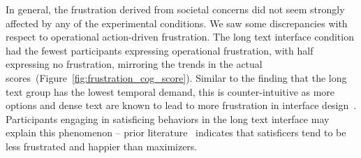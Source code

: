 In general, the frustration derived from societal concerns did not seem strongly affected by any of the experimental conditions. We saw some discrepancies with respect to operational action-driven frustration. The long text interface condition had the fewest participants expressing operational frustration, with half expressing no frustration, mirroring the trends in the actual scores~(Figure~\ref{fig:frustration_cog_score}). Similar to the finding that the long text group has the lowest temporal demand, this is counter-intuitive as more options and dense text are known to lead to more frustration in interface design~\cite{nielsen1997users}. Participants engaging in satisficing behaviors in the long text interface may explain this phenomenon -- prior literature~\cite{polmanWhyAreMaximizers2010, schwartzMaximizingSatisficingHappiness2002} indicates that satisficers tend to be less frustrated and happier than maximizers. 







